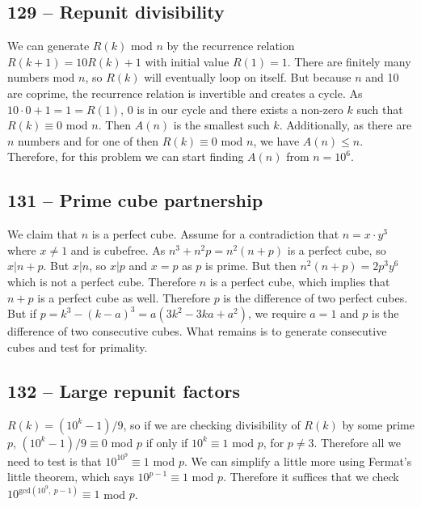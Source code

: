 \documentclass{article}
\begin{document}
\subsection*{129 -- Repunit divisibility} 
We can generate $R(k)$ mod $n$ by the recurrence relation $R(k+1) = 10R(k) + 1$ with initial value $R(1) = 1$. 
There are finitely many numbers mod $n$, so $R(k)$ will eventually loop on itself. 
But because $n$ and 10 are coprime, the recurrence relation is invertible and creates a cycle. 
As $10\cdot0 + 1 = 1 = R(1)$, 0 is in our cycle and there exists a non-zero $k$ such that $R(k) \equiv 0$ mod $n$. 
Then $A(n)$ is the smallest such $k$. 
Additionally, as there are $n$ numbers and for one of then $R(k) \equiv 0$ mod $n$, we have $A(n) \leq n$. 
Therefore, for this problem we can start finding $A(n)$ from $n=10^6$. 

\subsection*{131 -- Prime cube partnership} 
We claim that $n$ is a perfect cube. 
Assume for a contradiction that $n = x \cdot y^3$ where $x \neq 1$ and is cubefree. 
As $n^3 + n^2p = n^2(n+p)$ is a perfect cube, so $x | n+p$. 
But $x|n$, so $x|p$ and $x=p$ as $p$ is prime. 
But then $n^2(n+p) = 2p^3y^6$ which is not a perfect cube. 
Therefore $n$ is a perfect cube, which implies that $n+p$ is a perfect cube as well. 
Therefore $p$ is the difference of two perfect cubes. 
But if $p = k^3 - (k-a)^3 = a(3k^2 - 3ka + a^2)$, we require $a=1$ and $p$ is the difference of two consecutive cubes. 
What remains is to generate consecutive cubes and test for primality.

\subsection*{132 -- Large repunit factors} 
$R(k) = (10^k-1)/9$, so if we are checking divisibility of $R(k)$ by some prime $p$, $(10^k-1)/9 \equiv 0$ mod $p$ if only if  $10^k \equiv 1$ mod $p$,  for $p \neq 3$. 
Therefore all we need to test is that $10^{10^9} \equiv 1$ mod $p$. 
We can simplify a little more using Fermat's little theorem, which says $10^{p-1} \equiv 1$ mod $p$. 
Therefore it suffices that we check $10^{\text{gcd}(10^9,\:p-1)} \equiv 1$ mod $p$.
\end{document}
